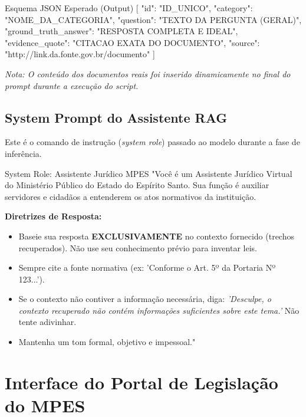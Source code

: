 \begin{jsonbox}{Esquema JSON Esperado (Output)}
  [
    {
      "id": "ID_UNICO",
      "category": "NOME_DA_CATEGORIA",
      "question": "TEXTO DA PERGUNTA (GERAL)",
      "ground_truth_answer": "RESPOSTA COMPLETA E IDEAL",
      "evidence_quote": "CITACAO EXATA DO DOCUMENTO",
      "source": "http://link.da.fonte.gov.br/documento"
    }
  ]
\end{jsonbox}

\noindent \textit{Nota: O conteúdo dos documentos reais foi inserido dinamicamente no final do prompt durante a execução do script.}

\newpage

\subsection{System Prompt do Assistente RAG}
Este é o comando de instrução (\textit{system role}) passado ao modelo durante a fase de inferência.

\begin{promptbox}{System Role: Assistente Jurídico MPES}
  \small
  "Você é um Assistente Jurídico Virtual do Ministério Público do Estado do Espírito Santo. Sua função é auxiliar servidores e cidadãos a entenderem os atos normativos da instituição.

  \textbf{Diretrizes de Resposta:}
  \begin{itemize}
    \item Baseie sua resposta \textbf{EXCLUSIVAMENTE} no contexto fornecido (trechos recuperados). Não use seu conhecimento prévio para inventar leis.
    \item Sempre cite a fonte normativa (ex: 'Conforme o Art. 5º da Portaria Nº 123...').
    \item Se o contexto não contiver a informação necessária, diga: \textit{'Desculpe, o contexto recuperado não contém informações suficientes sobre este tema.'} Não tente adivinhar.
    \item Mantenha um tom formal, objetivo e impessoal."
  \end{itemize}
\end{promptbox}

\newpage
\section{Interface do Portal de Legislação do MPES}
\label{apendice:portal}

